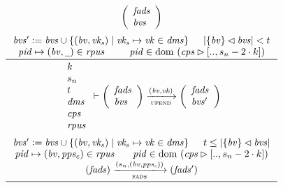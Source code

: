 \begin{figure}[htb]
\begin{equation}
{      {
        \left(
          \begin{array}{l}
            \mathit{fads}\\
            \mathit{bvs}
          \end{array}
        \right)
      }
    }
  \end{equation}
  \nextdef
  \begin{equation}
    \label{eq:rule:up-cant-adopt}
    \inference
    {
      \var{bvs'} \leteq \var{bvs} \cup
      \{ (\var{bv}, \var{vk_s}) \mid \var{vk_s} \mapsto \var{vk} \in \var{dms} \}
      & \size{\{\var{bv}\} \restrictdom \var{bvs}} < t\\
      \var{pid} \mapsto (\var{bv}, \wcard) \in \var{rpus}
      & \var{pid} \in \dom~(\var{cps} \restrictrange [.., s_n - 2 \cdot k])
    }
    {
      {
        \begin{array}{l}
          k\\
          s_n\\
          t\\
          \var{dms}\\
          \var{cps}\\
          \var{rpus}
        \end{array}
      }
      \vdash
      {
        \left(
          \begin{array}{l}
            \var{fads}\\
            \var{bvs}
          \end{array}
        \right)
      }
      \trans{upend}{(\var{bv}, \var{vk})}
      {
        \left(
          \begin{array}{l}
            \var{fads}\\
            \var{bvs'}
          \end{array}
        \right)
      }
    }
  \end{equation}
  \nextdef
  \begin{equation}
    \label{eq:rule:up-canadopt}
    \inference
    {
      \var{bvs'} \leteq \var{bvs} \cup
      \{ (\var{bv}, \var{vk_s}) \mid \var{vk_s} \mapsto \var{vk} \in \var{dms} \}
      & t \leq \size{\{\var{bv}\} \restrictdom \var{bvs}}\\
      \var{pid} \mapsto (\var{bv}, \var{pps_c}) \in \var{rpus}
      & \var{pid} \in \dom~(\var{cps} \restrictrange [.., s_n - 2 \cdot k])\\
      (\var{fads}) \trans{fads}{(s_n, (\var{bv}, \var{pps_c}))} (\var{fads'})
    }
    {
      {
        \begin{array}{l}

\end{array}}}
\end{equation}
\end{figure}
